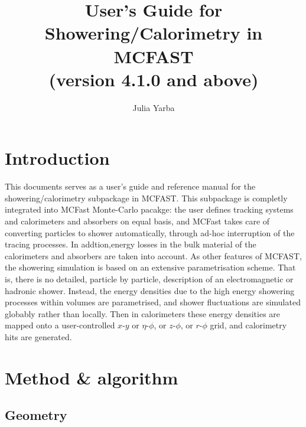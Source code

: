 \oddsidemargin=5mm
\evensidemargin=-5mm
\topmargin=0mm
\headheight=0mm
\headsep=0mm
\textheight=210mm
\textwidth=165mm
\title{User's Guide for Showering/Calorimetry in MCFAST \\
(version 4.1.0 and above) }
\author{Julia Yarba}


\maketitle
\section{Introduction}
This documents serves as a user's guide and reference manual for the
showering/calorimetry subpackage in MCFAST. 
This subpackage is completly integrated into
MCFast Monte-Carlo pacakge: the user defines tracking systems and 
calorimeters and absorbers on equal basis, and  MCFast takes care 
of converting particles to shower
automatically, through ad-hoc interruption of the tracing processes. 
In addtion,energy losses in the bulk material of the calorimeters and 
absorbers are taken into account. 
As other features of MCFAST, the showering simulation is based on an extensive
parametrisation scheme.  That is, there is no detailed, particle by particle,
description of an  electromagnetic or hadronic shower.  Instead, the energy
densities due to the high energy showering processes within volumes 
are parametrised, and shower fluctuations are simulated  globably rather
than locally. Then in calorimeters these energy densities are mapped onto 
a user-controlled $x$-$y$ or $\eta$-$\phi$, or $z$-$\phi$, or $r$-$\phi$ grid, 
and calorimetry hits are generated.  
 
\section{Method \& algorithm}
\subsection{Geometry}

